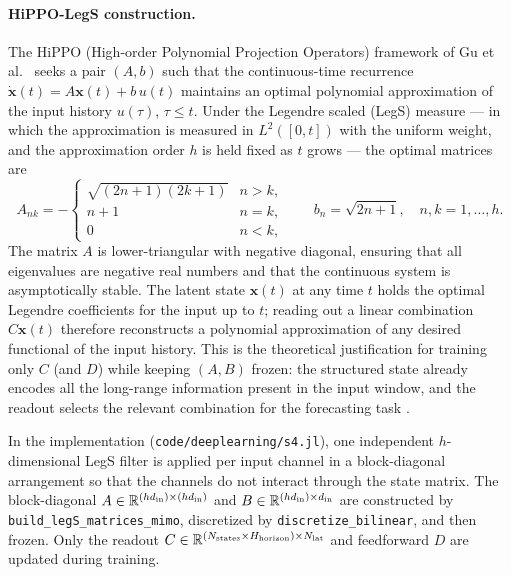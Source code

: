 \paragraph{HiPPO-LegS construction.}
The HiPPO (High-order Polynomial Projection Operators) framework of Gu et al.\
\cite{Gu2022} seeks a pair $(A, b)$ such that the continuous-time recurrence
$\dot{\mathbf{x}}(t) = A\mathbf{x}(t) + b\,u(t)$ maintains an optimal
polynomial approximation of the input history $u(\tau)$, $\tau \leq t$.  Under
the Legendre scaled (LegS) measure --- in which the approximation is measured
in $L^2([0,t])$ with the uniform weight, and the approximation order $h$ is
held fixed as $t$ grows --- the optimal matrices are
\begin{equation}\label{eq:app_hippo}
  A_{nk} = -\begin{cases}
              \sqrt{(2n+1)(2k+1)} & n > k,\\
              n + 1               & n = k,\\
              0                   & n < k,
            \end{cases}
  \qquad
  b_n = \sqrt{2n+1},
  \quad n, k = 1, \ldots, h.
\end{equation}
The matrix $A$ is lower-triangular with negative diagonal, ensuring that all
eigenvalues are negative real numbers and that the continuous system is
asymptotically stable.  The latent state $\mathbf{x}(t)$ at any time $t$ holds
the optimal Legendre coefficients for the input up to $t$; reading out a linear
combination $C\mathbf{x}(t)$ therefore reconstructs a polynomial approximation
of any desired functional of the input history.  This is the theoretical
justification for training only $C$ (and $D$) while keeping $(A, B)$ frozen:
the structured state already encodes all the long-range information present in
the input window, and the readout selects the relevant combination for the
forecasting task \cite{Gu2022}.

In the implementation (\texttt{code/deeplearning/s4.jl}), one independent
$h$-dimensional LegS filter is applied per input channel in a block-diagonal
arrangement so that the channels do not interact through the state matrix.
The block-diagonal $A \in \mathbb{R}^{(h d_{\rm in}) \times (h d_{\rm in})}$
and $B \in \mathbb{R}^{(h d_{\rm in}) \times d_{\rm in}}$ are constructed
by \texttt{build\_legS\_matrices\_mimo}, discretized by
\texttt{discretize\_bilinear}, and then frozen.  Only the readout
$C \in \mathbb{R}^{(N_{\rm states} \times H_{\rm horizon}) \times N_{\mathrm{lat}}}$
and feedforward $D$ are updated during training.
